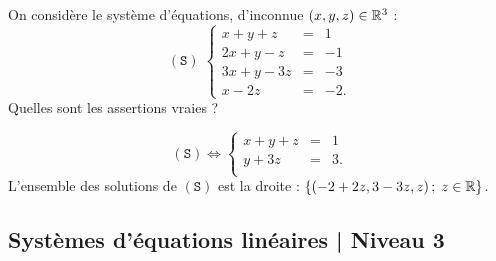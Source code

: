 \begin{question}
On considère le système d'équations, d'inconnue $(x,y,z)\in \mathbb{R}^3$ :  
$$(\mathtt{S}) \; \left\{\begin{array}{rcc}
x+y+z&=&1\\
2x+y-z&=&-1\\ 
3x+y-3z&=&-3\\
x-2z&=&-2.\end{array}\right.$$
Quelles sont les assertions vraies ?
\begin{answers}
\end{answers}
\begin{explanations}
$$(\mathtt{S}) \Leftrightarrow  \left\{\begin{array}{rcc}
x+y+z&=&1\\
y+3z&=&3.\\
\end{array}\right.$$
L'ensemble des solutions de $(\mathtt{S})$ est la droite : $\{(-2+2z,3-3z,z)\, ; \; z \in \mathbb{R}\}$.
\end{explanations}
\end{question}


\subsection{Systèmes d'équations linéaires | Niveau 3}

